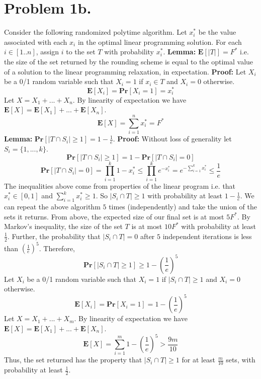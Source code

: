 \documentclass[12pt]{article}
\begin{document}
\section*{Problem 1b.}
Consider the following randomized polytime algorithm. Let $x^*_i$ be the value
associated with each $x_i$ in the optimal linear programming solution. For each
$i \in [1..n]$, assign $i$ to the set $T$ with probability $x^*_i$.
\vspace{2mm}
\newline
\textbf{Lemma:} $\textbf{E}[|T|] = F^*$ i.e. the size of the set returned
by the rounding scheme is equal to the optimal value of a solution to the linear
programming relaxation, in expectation.
\vspace{2mm}
\newline
\textbf{Proof:} Let $X_i$ be a 0/1 random variable such that
$X_i = 1$ if $x_i \in T$ and $X_i = 0$ otherwise.
$$\textbf{E}[X_i] = \textbf{Pr}[X_i = 1] = x^*_i$$
Let $X = X_1 + ... + X_n$. By linearity of expectation we have
$\textbf{E}[X] = \textbf{E}[X_1] + ... + \textbf{E}[X_n]$.
$$\textbf{E}[X] = \sum^n_{i=1} x^*_i = F^*$$
\textbf{Lemma:} $\textbf{Pr}[|T\cap S_i|\ge 1] = 1 - \frac{1}{e}$.
\vspace{2mm}
\newline
\textbf{Proof:} Without loss of generality let $S_i = \{1,...,k\}$.
$$\textbf{Pr}[|T\cap S_i| \ge 1] = 1 - \textbf{Pr}[|T\cap S_i| = 0]$$
$$ \textbf{Pr}[|T\cap S_i| = 0] =
\prod_{i=1}^k 1-x^*_i \le \prod_{i=1}^k e^{-x^*_i}
= e^{-\sum^k_{i=1} x^*_i} \le \frac{1}{e}$$
The inequalities above come from properties of the linear program i.e. that
$x^*_i \in [0,1]$ and $\sum^k_{i=1} x^*_i \ge 1$. So $|S_i \cap T| \ge 1$ with
probability at least $1-\frac{1}{e}$.
\newpage
\noindent We can repeat the above algorithm $5$ times (independently) and take the union
of the sets it returns. From above, the expected size of our final set is at
most $5F^*$. By Markov's inequality, the size of the set $T$ is at most
$10F^*$ with probability at least $\frac{1}{2}$. Further, the probability that
$|S_i \cap T| = 0$ after $5$ independent iterations is less than
$\left(\frac{1}{e}\right)^5$. Therefore,
$$\textbf{Pr}[|S_i\cap T| \ge 1] \ge 1 - \left(\frac{1}{e}\right)^5$$
Let $X_i$ be a 0/1 random variable such that $X_i = 1$ if $|S_i \cap T| \ge 1$
and $X_i = 0$ otherwise.
$$\textbf{E}[X_i] = \textbf{Pr}[X_i = 1] = 1 - \left(\frac{1}{e}\right)^5$$
Let $X = X_1 + ... + X_m$. By linearity of expectation we have
$\textbf{E}[X] = \textbf{E}[X_1] + ... + \textbf{E}[X_n]$.
$$\textbf{E}[X] = \sum^m_{i=1} 1 - \left(\frac{1}{e}\right)^5 > \frac{9m}{10}$$
Thus, the set returned has the property that $|S_i\cap T| \ge 1$ for
at least $\frac{m}{10}$ sets, with probability at least $\frac{1}{2}$.
\end{document}
